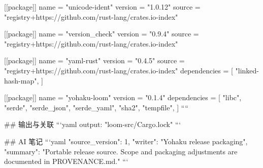 [[package]]
name = "unicode-ident"
version = "1.0.12"
source = "registry+https://github.com/rust-lang/crates.io-index"

[[package]]
name = "version_check"
version = "0.9.4"
source = "registry+https://github.com/rust-lang/crates.io-index"

[[package]]
name = "yaml-rust"
version = "0.4.5"
source = "registry+https://github.com/rust-lang/crates.io-index"
dependencies = [
 "linked-hash-map",
]

[[package]]
name = "yohaku-loom"
version = "0.1.4"
dependencies = [
 "libc",
 "serde",
 "serde_json",
 "serde_yaml",
 "sha2",
 "tempfile",
]
````

## 输出与关联
```yaml
output: "loom-src/Cargo.lock"
```

## AI 笔记
```yaml
{"source_version": 1, "writer": "Yohaku release packaging", "summary": "Portable release source. Scope and packaging adjustments are documented in PROVENANCE.md."}
```
